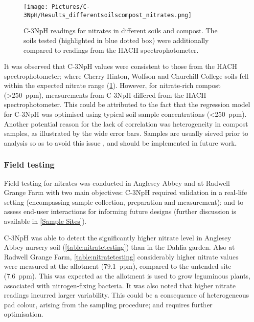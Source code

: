 \begin{figure}
	\centering
	\texttt{[image: Pictures/C-3NpH/Results\_differentsoilscompost\_nitrates.png]}
	\captionsetup{justification = centering}
	\caption{C-3NpH readings for nitrates in different soils and compost. The soils tested (highlighted in blue dotted box) were additionally compared to readings from the HACH spectrophotometer.}
	\label{fig:soilcomp}
\end{figure}

It was observed that C-3NpH values were consistent to those from the HACH spectrophotometer; where Cherry Hinton, Wolfson and Churchill College soils fell within the expected nitrate range (\cref{fig:soilcomp}). However, for nitrate-rich compost (\SI{>250}{ppm}), measurements from C-3NpH differed from the HACH spectrophotometer. This could be attributed to the fact that the regression model for C-3NpH was optimised using typical soil sample concentrations (\SI{<250}{ppm}). Another potential reason for the lack of correlation was heterogeneity in compost samples, as illustrated by the wide error bars. Samples are usually sieved prior to analysis so as to avoid this issue \cite{ISO2006}, and should be implemented in future work.  



\newpage
\subsubsection{Field testing}


Field testing for nitrates was conducted in Anglesey Abbey and at Radwell Grange Farm with two main objectives: C-3NpH required validation in a real-life setting (encompassing sample collection, preparation and measurement); and to assess end-user interactions for informing future designs
(further discussion is available in \cref{Sample Sites}).

C-3NpH was able to detect the significantly higher nitrate level in Anglesey Abbey nursery soil (\cref{table:nitratetesting}) than in the Dahlia garden. Also at Radwell Grange Farm, \cref{table:nitratetesting} considerably higher nitrate values were measured at the allotment (\SI{79.1}{ppm}), compared to the untended site (\SI{7.6}{ppm}). This was expected as the allotment is used to grow leguminous plants, associated with nitrogen-fixing bacteria. It was also noted that higher nitrate readings incurred larger variability. This could be a consequence of heterogeneous pad colour, arising from the sampling procedure; and requires further optimisation. 


